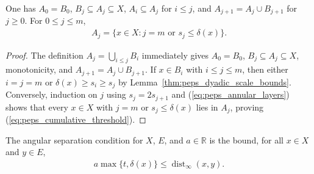 \begin{lemma}
    \label{thm:peps_cumulative_layer_identities}
    \leanok
    One has $A_0=B_0$, $B_j\subseteq A_j\subseteq X$, $A_i\subseteq A_j$ for
    $i\le j$, and $A_{j+1}=A_j\cup B_{j+1}$ for $j\ge0$. For $0\le j\le m$,
    \begin{align}
        A_j=\{x\in X:j=m\text{ or }s_j\le\delta(x)\}.
        \label{eq:peps_cumulative_threshold}
    \end{align}
\end{lemma}
\begin{proof}
    \leanok
    The definition $A_j=\bigcup_{i\le j}B_i$ immediately gives $A_0=B_0$,
    $B_j\subseteq A_j\subseteq X$, monotonicity, and $A_{j+1}=A_j\cup B_{j+1}$.
    If $x\in B_i$ with $i\le j\le m$, then either $i=j=m$ or
    $\delta(x)\ge s_i\ge s_j$ by Lemma~\ref{thm:peps_dyadic_scale_bounds}.
    Conversely, induction on $j$ using $s_j=2s_{j+1}$ and
    (\ref{eq:peps_annular_layers}) shows that every $x\in X$ with $j=m$ or
    $s_j\le\delta(x)$ lies in $A_j$, proving (\ref{eq:peps_cumulative_threshold}).
\end{proof}

\begin{definition}
    \label{def:peps_angular_separation}
    \leanok
    The angular separation condition for $X$, $E$, and $a\in\mathbb R$ is the
    bound, for all $x\in X$ and $y\in E$,
    \begin{align}
        a\max\{t,\delta(x)\}\le\operatorname{dist}_{\infty}(x,y).
        \label{eq:peps_angular_separation}
    \end{align}
\end{definition}

